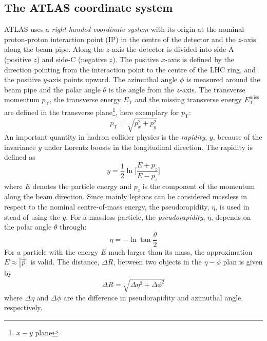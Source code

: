 \subsection{The ATLAS coordinate system}
\label{subsec:ae_atlas_coordinate}
ATLAS uses a \textit{right-handed coordinate system} with its origin at the nominal proton-proton interaction point (IP) in the centre of the detector and the $z$-axis along the beam pipe.
Along the $z$-axis the detector is divided into side-A (positive $z$) and side-C (negative $z$).
The positive $x$-axis is defined by the direction pointing from the interaction point to the centre of the LHC ring, and the positive $y$-axis points upward.%
The azimuthal angle $\phi$ is measured around the beam pipe  and the polar angle $\theta$ is the angle from the $z$-axis.
The transverse momentum $p_{\mathrm{T}}$, the transverse energy $E_{\mathrm{T}}$ and the missing transverse
energy $E_{\mathrm{T}}^{\mathrm{miss}}$ are defined in the transverse plane\footnote{$x-y$ plane}, here exemplary for $p_{\mathrm{T}}$:
%
\begin{equation}
p_{\mathrm{T}}= \sqrt{p_{x}^{2} + p_{y}^{2}}
\end{equation}
%
An important quantity in hadron collider physics is the \textit{rapidity}, $y$, because of the invariance $y$ under Lorentz boosts in the longitudinal direction.
The rapidity is defined as
%
\begin{equation}
y = \frac{1}{2} \ln\Big[\frac{E + p_{z}}{E - p_{z}}\Big]
\end{equation}
%
where $E$ denotes the particle energy and $p_{z}$  is the component of the momentum along the beam direction.
Since mainly leptons can be considered massless in respect to the nominal centre-of-mass energy, the pseudorapidity, $\eta$, is used in stead of using the $y$.
For a massless particle, the \textit{pseudorapidity}, $\eta$, depends on the polar angle $\theta$ through:
%
\begin{equation}
\eta = - \ln \tan \frac{\theta}{2}
\end{equation}
%
For a particle with the energy $E$ much larger than its mass, the approximation $E \approx |\vec{p}|$ is valid.
The distance, $\Delta R$, between two objects in the $\eta-\phi$ plan is given by
%
\begin{equation}
\Delta R = \sqrt{\Delta \eta^{2} + \Delta \phi^{2}}
\end{equation}
%
where $\Delta \eta$ and $\Delta \phi$ are the difference in pseudorapidity and azimuthal angle, respectively.

